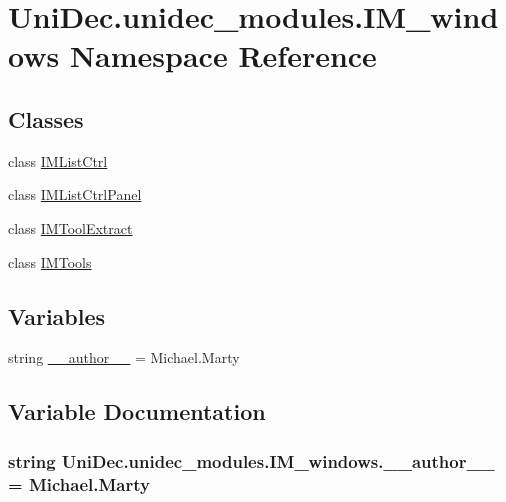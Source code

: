 \hypertarget{namespace_uni_dec_1_1unidec__modules_1_1_i_m__windows}{}\section{Uni\+Dec.\+unidec\+\_\+modules.\+I\+M\+\_\+windows Namespace Reference}
\label{namespace_uni_dec_1_1unidec__modules_1_1_i_m__windows}
\subsection*{Classes}
\begin{DoxyCompactItemize}
\item 
class \hyperlink{class_uni_dec_1_1unidec__modules_1_1_i_m__windows_1_1_i_m_list_ctrl}{I\+M\+List\+Ctrl}
\item 
class \hyperlink{class_uni_dec_1_1unidec__modules_1_1_i_m__windows_1_1_i_m_list_ctrl_panel}{I\+M\+List\+Ctrl\+Panel}
\item 
class \hyperlink{class_uni_dec_1_1unidec__modules_1_1_i_m__windows_1_1_i_m_tool_extract}{I\+M\+Tool\+Extract}
\item 
class \hyperlink{class_uni_dec_1_1unidec__modules_1_1_i_m__windows_1_1_i_m_tools}{I\+M\+Tools}
\end{DoxyCompactItemize}
\subsection*{Variables}
\begin{DoxyCompactItemize}
\item 
string \hyperlink{namespace_uni_dec_1_1unidec__modules_1_1_i_m__windows_ae67a5945d6aba240db905dd996f9485d}{\+\_\+\+\_\+author\+\_\+\+\_\+} = \textquotesingle{}Michael.\+Marty\textquotesingle{}
\end{DoxyCompactItemize}


\subsection{Variable Documentation}
\hypertarget{namespace_uni_dec_1_1unidec__modules_1_1_i_m__windows_ae67a5945d6aba240db905dd996f9485d}{}
\subsubsection[{\+\_\+\+\_\+author\+\_\+\+\_\+}]{\setlength{\rightskip}{0pt plus 5cm}string Uni\+Dec.\+unidec\+\_\+modules.\+I\+M\+\_\+windows.\+\_\+\+\_\+author\+\_\+\+\_\+ = \textquotesingle{}Michael.\+Marty\textquotesingle{}}\label{namespace_uni_dec_1_1unidec__modules_1_1_i_m__windows_ae67a5945d6aba240db905dd996f9485d}
